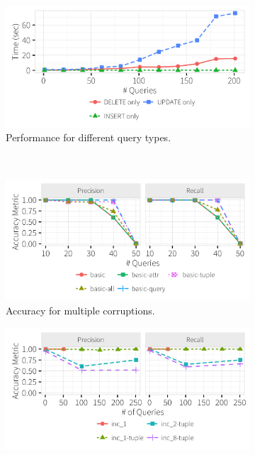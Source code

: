 \begin{figure}[h]
\begin{subfigure}[t]{.3\textwidth}
    \label{f:singlequeryinc_time} 
    \end{subfigure}
    \begin{subfigure}[t]{.3\textwidth}
    \includegraphics[width = .99\columnwidth]{figures/indelup_time}
    \vspace*{-.25in}
    \caption{Performance for different query types.}
    \label{f:indelup_time} 
    \end{subfigure}
    \\
    \begin{subfigure}[t]{.3\textwidth}
    \includegraphics[width = .99\columnwidth]{figures/multi_pr}
    \vspace*{-.25in}
    \caption{Accuracy for multiple corruptions.}
    \label{f:multi_acc} 
    \end{subfigure}
    \begin{subfigure}[t]{.3\textwidth}
    \includegraphics[width = .99\columnwidth]{figures/incrementalcompare_acc}

\end{subfigure}
\end{figure}
